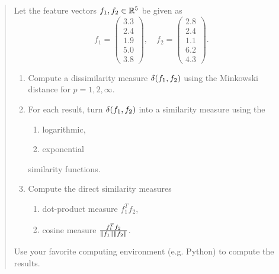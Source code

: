 \documentclass[english]{exercise}
\begin{document}
    \begin{quote}
        Let the feature vectors \(f_1, f_2 \in \R^5\) be given as
        \[
            f_1 = \begin{pmatrix}
                3.3\\
                2.4\\
                1.9\\
                5.0\\
                3.8
            \end{pmatrix}, \quad f_2 = \begin{pmatrix}
                2.8\\
                2.4\\
                1.1\\
                6.2\\
                4.3
            \end{pmatrix}.
        \]
        \begin{enumerate}
            \item Compute a dissimilarity measure \(\delta\parentheses*{f_1, f_2}\) using the Minkowski distance for \(p = 1, 2, \infty\).
            \item For each result, turn \(\delta\parentheses*{f_1, f_2}\) into a similarity measure using the
            \begin{enumerate}
                \item logarithmic,
                \item exponential
            \end{enumerate}
            similarity functions.
            \item Compute the direct similarity measures
            \begin{enumerate}
                \item dot-product measure \(f_1^T f_2\),
                \item cosine measure \(\frac{f_1^T f_2}{\norm*{f_1}\norm*{f_2}}\).
            \end{enumerate}
        \end{enumerate}
        Use your favorite computing environment (e.g. Python) to compute the results.
    \end{quote}
    
\end{document}
